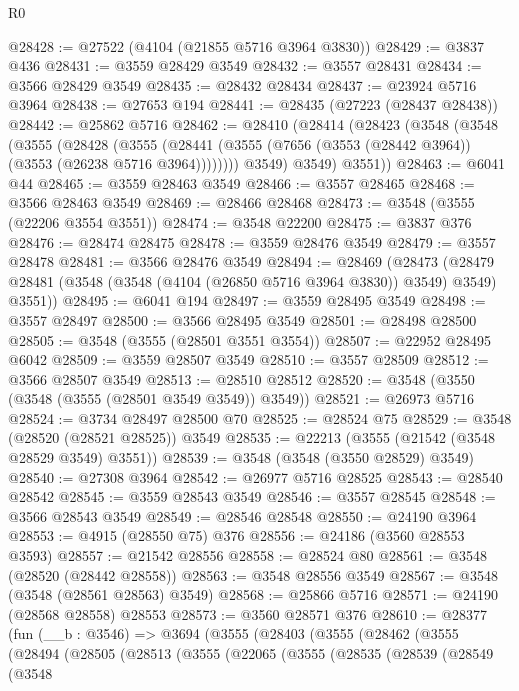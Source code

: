 \begin{lexlean}{R0}
\begin{coremodule}
@28428 := @27522 (@4104 (@21855 @5716 @3964 @3830))
@28429 := @3837 @436
@28431 := @3559 @28429 @3549
@28432 := @3557 @28431
@28434 := @3566 @28429 @3549
@28435 := @28432 @28434
@28437 := @23924 @5716 @3964
@28438 := @27653 @194
@28441 := @28435 (@27223 (@28437 @28438))
@28442 := @25862 @5716
@28462 := @28410
    (@28414
      (@28423
        (@3548
          (@3548
            (@3555
              (@28428
                (@3555
                  (@28441 (@3555 (@7656 (@3553 (@28442 @3964)) (@3553 (@26238 @5716 @3964))))))))
            @3549)
          @3549)
        @3551))
@28463 := @6041 @44
@28465 := @3559 @28463 @3549
@28466 := @3557 @28465
@28468 := @3566 @28463 @3549
@28469 := @28466 @28468
@28473 := @3548 (@3555 (@22206 @3554 @3551))
@28474 := @3548 @22200
@28475 := @3837 @376
@28476 := @28474 @28475
@28478 := @3559 @28476 @3549
@28479 := @3557 @28478
@28481 := @3566 @28476 @3549
@28494 := @28469
    (@28473 (@28479 @28481 (@3548 (@3548 (@4104 (@26850 @5716 @3964 @3830)) @3549) @3549) @3551))
@28495 := @6041 @194
@28497 := @3559 @28495 @3549
@28498 := @3557 @28497
@28500 := @3566 @28495 @3549
@28501 := @28498 @28500
@28505 := @3548 (@3555 (@28501 @3551 @3554))
@28507 := @22952 @28495 @6042
@28509 := @3559 @28507 @3549
@28510 := @3557 @28509
@28512 := @3566 @28507 @3549
@28513 := @28510 @28512
@28520 := @3548 (@3550 (@3548 (@3555 (@28501 @3549 @3549)) @3549))
@28521 := @26973 @5716
@28524 := @3734 @28497 @28500 @70
@28525 := @28524 @75
@28529 := @3548 (@28520 (@28521 @28525)) @3549
@28535 := @22213 (@3555 (@21542 (@3548 @28529 @3549) @3551))
@28539 := @3548 (@3548 (@3550 @28529) @3549)
@28540 := @27308 @3964
@28542 := @26977 @5716 @28525
@28543 := @28540 @28542
@28545 := @3559 @28543 @3549
@28546 := @3557 @28545
@28548 := @3566 @28543 @3549
@28549 := @28546 @28548
@28550 := @24190 @3964
@28553 := @4915 (@28550 @75) @376
@28556 := @24186 (@3560 @28553 @3593)
@28557 := @21542 @28556
@28558 := @28524 @80
@28561 := @3548 (@28520 (@28442 @28558))
@28563 := @3548 @28556 @3549
@28567 := @3548 (@3548 (@28561 @28563) @3549)
@28568 := @25866 @5716
@28571 := @24190 (@28568 @28558) @28553
@28573 := @3560 @28571 @376
@28610 := @28377
    (fun (__b : @3546) =>
    @3694
      (@3555
        (@28403
          (@3555
            (@28462
              (@3555
                (@28494
                  (@28505
                    (@28513
                      (@3555
                        (@22065
                          (@3555
                            (@28535
                              (@28539
                                (@28549
                                  (@3548

\end{coremodule}
\end{lexlean}
